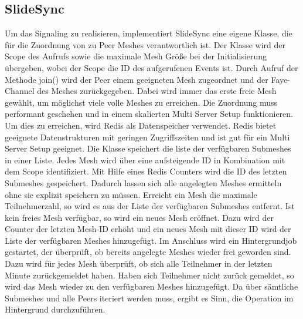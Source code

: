 \begin{description}

\subsection{SlideSync}
Um das Signaling zu realisieren, implementiert SlideSync eine eigene Klasse, die für die Zuordnung von \clients zu Peer Meshes verantwortlich ist. Der Klasse wird der Scope des Aufrufs sowie die maximale Mesh Größe bei der Initialisierung übergeben, wobei der Scope die ID des aufgerufenen Events ist. Durch Aufruf der Methode join() wird der Peer einem geeigneten Mesh zugeordnet und der Faye-Channel des Meshes zurückgegeben. Dabei wird immer das erste freie Mesh gewählt, um möglichst viele volle Meshes zu erreichen. 
Die Zuordnung muss performant geschehen und in einem skalierten Multi Server Setup funktionieren. Um dies zu erreichen, wird Redis als Datenspeicher verwendet. Redis bietet geeignete Datenstrukturen mit geringen Zugriffszeiten und ist gut für ein Multi Server Setup geeignet. 
Die Klasse speichert die liste der verfügbaren Submeshes in einer Liste. Jedes Mesh wird über eine aufsteigende ID in Kombination mit dem Scope identifiziert. Mit Hilfe eines Redis Counters wird die ID des letzten Submeshes gespeichert. Dadurch lassen sich alle angelegten Meshes ermitteln ohne sie explizit speichern zu müssen. Erreicht ein Mesh die maximale Teilnehmerzahl, so wird es aus der Liste der verfügbaren Submeshes entfernt. Ist kein freies Mesh verfügbar, so wird ein neues Mesh eröffnet. Dazu wird der Counter der letzten Mesh-ID erhöht und ein neues Mesh mit dieser ID wird der Liste der verfügbaren Meshes hinzugefügt. Im Anschluss wird ein Hintergrundjob gestartet, der überprüft, ob bereits angelegte Meshes wieder frei geworden sind. Dazu wird für jedes Mesh überprüft, ob sich alle Teilnehmer in der letzten Minute zurückgemeldet haben. Haben sich Teilnehmer nicht zurück gemeldet, so wird das Mesh wieder zu den verfügbaren Meshes hinzugefügt. Da über sämtliche Submeshes und alle Peers iteriert werden muss, ergibt es Sinn, die Operation im Hintergrund durchzuführen.

\end{description}
